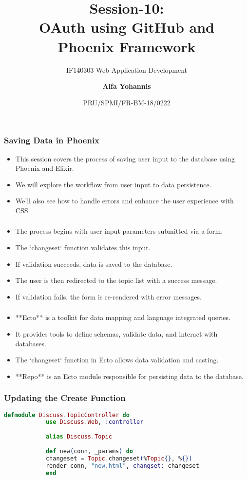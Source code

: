\documentclass[aspectratio=169, table]{beamer}
\subtitle{IF140303-Web Application Development}
\title{Session-10:\\ \LARGE{OAuth using GitHub and\\Phoenix Framework}
	\vspace{5pt}}
\date[Serial]{\scriptsize {PRU/SPMI/FR-BM-18/0222}}
\author[Pradita]{\small{\textbf{Alfa Yohannis}}}
\begin{document}
	
	\frame{\titlepage}
	
	\begin{frame}
		\frametitle{Saving Data in Phoenix}
		\begin{itemize}
			\item This session covers the process of saving user input to the database using Phoenix and Elixir.
			\item We will explore the workflow from user input to data persistence.
			\item We’ll also see how to handle errors and enhance the user experience with CSS.
		\end{itemize}
	\end{frame}
	
	\begin{frame}
		\frametitle{}
		\begin{itemize}
			\item The process begins with user input parameters submitted via a form.
			\item The `changeset` function validates this input.
			\item If validation succeeds, data is saved to the database.
			\item The user is then redirected to the topic list with a success message.
			\item If validation fails, the form is re-rendered with error messages.
		\end{itemize}
	\end{frame}
	
	\begin{frame}
		\frametitle{\shortstack{Understanding \\ Ecto}}
		\begin{itemize}
			\item **Ecto** is a toolkit for data mapping and language integrated queries.
			\item It provides tools to define schemas, validate data, and interact with databases.
			\item The `changeset` function in Ecto allows data validation and casting.
			\item **Repo** is an Ecto module responsible for persisting data to the database.
		\end{itemize}
	\end{frame}
	
	\begin{frame}[fragile]
		\frametitle{Updating the Create Function}
		\begin{lstlisting}[language=Elixir]
			defmodule Discuss.TopicController do
			use Discuss.Web, :controller
			
			alias Discuss.Topic
			
			def new(conn, _params) do
			changeset = Topic.changeset(%Topic{}, %{})
			render conn, "new.html", changset: changeset
			end
		\end{lstlisting}
	\end{frame}
	
\end{document}
